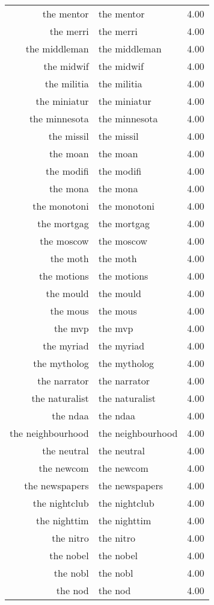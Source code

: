 \begin{table}[ht]
\begin{tabular}{rlr}
  the mentor & the mentor & 4.00 \\ 
  the merri & the merri & 4.00 \\ 
  the middleman & the middleman & 4.00 \\ 
  the midwif & the midwif & 4.00 \\ 
  the militia & the militia & 4.00 \\ 
  the miniatur & the miniatur & 4.00 \\ 
  the minnesota & the minnesota & 4.00 \\ 
  the missil & the missil & 4.00 \\ 
  the moan & the moan & 4.00 \\ 
  the modifi & the modifi & 4.00 \\ 
  the mona & the mona & 4.00 \\ 
  the monotoni & the monotoni & 4.00 \\ 
  the mortgag & the mortgag & 4.00 \\ 
  the moscow & the moscow & 4.00 \\ 
  the moth & the moth & 4.00 \\ 
  the motions & the motions & 4.00 \\ 
  the mould & the mould & 4.00 \\ 
  the mous & the mous & 4.00 \\ 
  the mvp & the mvp & 4.00 \\ 
  the myriad & the myriad & 4.00 \\ 
  the mytholog & the mytholog & 4.00 \\ 
  the narrator & the narrator & 4.00 \\ 
  the naturalist & the naturalist & 4.00 \\ 
  the ndaa & the ndaa & 4.00 \\ 
  the neighbourhood & the neighbourhood & 4.00 \\ 
  the neutral & the neutral & 4.00 \\ 
  the newcom & the newcom & 4.00 \\ 
  the newspapers & the newspapers & 4.00 \\ 
  the nightclub & the nightclub & 4.00 \\ 
  the nighttim & the nighttim & 4.00 \\ 
  the nitro & the nitro & 4.00 \\ 
  the nobel & the nobel & 4.00 \\ 
  the nobl & the nobl & 4.00 \\ 
  the nod & the nod & 4.00 \\ 

\end{tabular}
\end{table}
